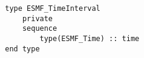 \begin{verbatim}
        type ESMF_TimeInterval 
            private
            sequence
                type(ESMF_Time) :: time
        end type
\end{verbatim}
